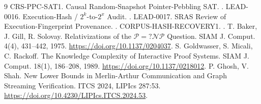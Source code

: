 \documentclass[11pt]{article}
\begin{document}
\begin{thebibliography}{9}
 CRS-PPC-SAT1. Causal Random-Snapshot Pointer-Pebbling SAT.
.
 LEAD-0016. Execution-Hash / $2^k$-to-$2^x$ Audit.
.
 LEAD-0017. SRAS Review of Execution-Fingerprint Provenance.
.
 CORPUS-HASH-RECOVERY1.
.
 T. Baker, J. Gill, R. Solovay. Relativizations of the
$\mathcal P=?\mathcal{NP}$ Question. SIAM J. Comput. 4(4), 431--442, 1975.
\url{https://doi.org/10.1137/0204037}.
 S. Goldwasser, S. Micali, C. Rackoff. The Knowledge Complexity
of Interactive Proof Systems. SIAM J. Comput. 18(1), 186--208, 1989.
\url{https://doi.org/10.1137/0218012}.
 P. Ghosh, V. Shah. New Lower Bounds in Merlin-Arthur Communication
and Graph Streaming Verification. ITCS 2024, LIPIcs 287:53.
\url{https://doi.org/10.4230/LIPIcs.ITCS.2024.53}.
\end{thebibliography}
\end{document}
